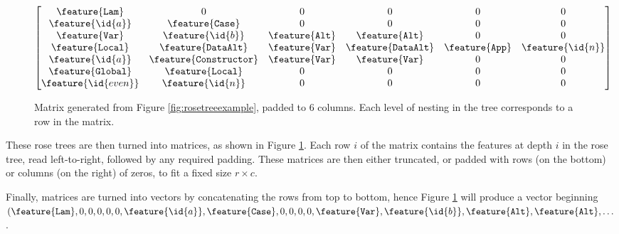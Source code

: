 \begin{figure}
    \begin{equation*}
      \begin{bmatrix}
        \feature{\CLam}      & 0                       & 0                 & 0                   & 0               & 0                \\
        \feature{\id{a}}     & \feature{\CCase}        & 0                 & 0                   & 0               & 0                \\
        \feature{\CVar}      & \feature{\id{b}}        & \feature{\CAlt}   & \feature{\CAlt}     & 0               & 0                \\
        \feature{\CLocal}    & \feature{\CDataAlt}     & \feature{\CVar}   & \feature{\CDataAlt} & \feature{\CApp} & \feature{\id{n}} \\
        \feature{\id{a}}     & \feature{\CConstructor} & \feature{\CVar}   & \feature{\CVar}     & 0               & 0                \\
        \feature{\CGlobal}   & \feature{\CLocal}       & 0                 & 0                   & 0               & 0                \\
        \feature{\id{even}}  & \feature{\id{n}}        & 0                 & 0                   & 0               & 0
      \end{bmatrix}
    \end{equation*}
    \caption{Matrix generated from Figure \ref{fig:rosetreeexample}, padded to 6 columns. Each level of nesting in the tree corresponds to a row in the matrix.}
    \label{fig:matrixexample}
\end{figure}

These rose trees are then turned into matrices, as shown in Figure
\ref{fig:matrixexample}. Each row $i$ of the matrix contains the features at
depth $i$ in the rose tree, read left-to-right, followed by any required
padding. These matrices are then either truncated, or padded with rows (on the
bottom) or columns (on the right) of zeros, to fit a fixed size $r \times c$.

\begin{sloppypar}
  Finally, matrices are turned into vectors by concatenating the rows from top
  to bottom, hence Figure \ref{fig:matrixexample} will produce a vector
  beginning
  $(\feature{\CLam} ,
    0               ,
    0               ,
    0               ,
    0               ,
    0               ,
    \feature{\id{a}},
    \feature{\CCase},
    0               ,
    0               ,
    0               ,
    0               ,
    \feature{\CVar} ,
    \feature{\id{b}},
    \feature{\CAlt} ,
    \feature{\CAlt} ,
    \dots$.
\end{sloppypar}

